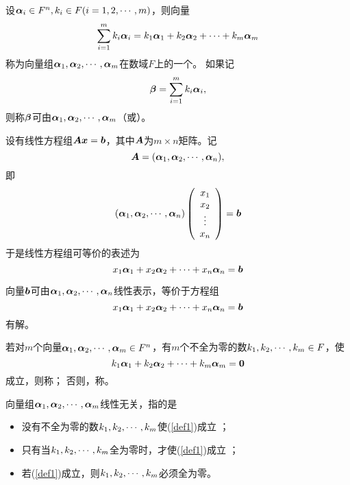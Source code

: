 \begin{frame}
\begin{dingyi}[线性表示]
  设$\boldsymbol{\alpha}_i\in F^n, k_i \in F (i=1,2,\cdots,m)$，则向量
  $$
  \sum_{i=1}^m k_i\boldsymbol{\alpha}_i = k_1\boldsymbol{\alpha}_1 + k_2\boldsymbol{\alpha}_2+\cdots + k_m\boldsymbol{\alpha}_m
  $$
  称为向量组$\boldsymbol{\alpha}_1,\boldsymbol{\alpha}_2,\cdots,\boldsymbol{\alpha}_m$在数域$F$上的一个。  如果记
  $$\boldsymbol{\beta}=\sum_{i=1}^m k_i\boldsymbol{\alpha}_i,$$
  则称$\boldsymbol{\beta}$可由$\boldsymbol{\alpha}_1,\boldsymbol{\alpha}_2,\cdots,\boldsymbol{\alpha}_m$（或）。
\end{dingyi}
\end{frame}

\begin{frame}
设有线性方程组$\boldsymbol{A}{\boldsymbol{x}}={\boldsymbol{b}}$，其中$\boldsymbol{A}$为$m\times n$矩阵。记
$$\boldsymbol{A}=(\boldsymbol{\alpha}_1,\boldsymbol{\alpha}_2,\cdots,\boldsymbol{\alpha}_n),$$
即
$$
(\boldsymbol{\alpha}_1,\boldsymbol{\alpha}_2,\cdots,\boldsymbol{\alpha}_n) \left(
\begin{array}{c}
  x_1\\
  x_2\\
  \vdots\\
  x_n
\end{array}
\right)={\boldsymbol{b}}
$$
于是线性方程组可等价的表述为
$$
x_1\boldsymbol{\alpha}_1+x_2\boldsymbol{\alpha}_2+\cdots+x_n\boldsymbol{\alpha}_n={\boldsymbol{b}}
$$
\end{frame}

\begin{frame}
\begin{zhu*}
  向量${\boldsymbol{b}}$可由$\boldsymbol{\alpha}_1,\boldsymbol{\alpha}_2,\cdots,\boldsymbol{\alpha}_n$线性表示，等价于方程组
  $$
  x_1\boldsymbol{\alpha}_1+x_2\boldsymbol{\alpha}_2+\cdots+x_n\boldsymbol{\alpha}_n={\boldsymbol{b}}
  $$
  有解。
\end{zhu*}
\end{frame}

\begin{frame}
\begin{dingyi}[线性相关与线性无关]
  若对$m$个向量$\boldsymbol{\alpha}_1,\boldsymbol{\alpha}_2,\cdots,\boldsymbol{\alpha}_m\in F^n$，有$m$个不全为零的数$k_1,k_2,\cdots,k_m\in F$，使
  \begin{equation}\label{def1}
    k_1\boldsymbol{\alpha}_1 + k_2\boldsymbol{\alpha}_2+\cdots + k_m\boldsymbol{\alpha}_m = \boldsymbol{0}        
  \end{equation}
  成立，则称；
  否则，称。
\end{dingyi}
\end{frame}

\begin{frame}
\begin{zhu*}
  向量组$\boldsymbol{\alpha}_1,\boldsymbol{\alpha}_2,\cdots,\boldsymbol{\alpha}_m$线性无关，指的是
  \begin{itemize}
  \item 没有不全为零的数$k_1,k_2,\cdots,k_m$使(\ref{def1})成立 ；
  \item 只有当$k_1,k_2,\cdots,k_m$全为零时，才使(\ref{def1})成立 ；
  \item 若(\ref{def1})成立，则$k_1,k_2,\cdots,k_m$必须全为零。
  \end{itemize}
\end{zhu*}
\end{frame}


